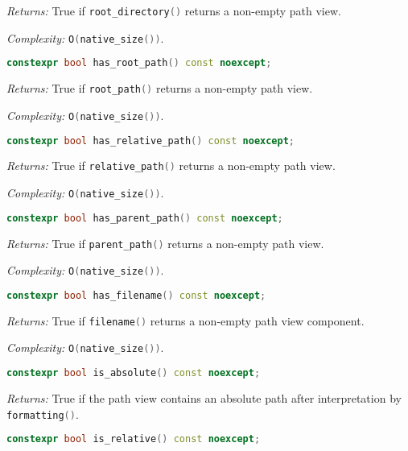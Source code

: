 \documentclass[11pt]{article}
\newcommand{\code}[2][cpp]{\lstinline[language=#1,basicstyle=\small\ttfamily]{#2}}
\newcommand{\desc}[1]{\textit{#1}}
\newcommand{\returns}{\desc{Returns: }}
\newcommand{\complexity}{\desc{Complexity: }}
\begin{document}
\returns True if \code{root_directory()} returns a non-empty path view.

\complexity \code{O(native_size())}.\\

\begin{lstlisting}[language=cpp]
    constexpr bool has_root_path() const noexcept;
\end{lstlisting}

\returns True if \code{root_path()} returns a non-empty path view.

\complexity \code{O(native_size())}.\\

\begin{lstlisting}[language=cpp]
    constexpr bool has_relative_path() const noexcept;
\end{lstlisting}

\returns True if \code{relative_path()} returns a non-empty path view.

\complexity \code{O(native_size())}.\\

\begin{lstlisting}[language=cpp]
    constexpr bool has_parent_path() const noexcept;
\end{lstlisting}

\returns True if \code{parent_path()} returns a non-empty path view.

\complexity \code{O(native_size())}.\\

\begin{lstlisting}[language=cpp]
    constexpr bool has_filename() const noexcept;
\end{lstlisting}

\returns True if \code{filename()} returns a non-empty path view component.

\complexity \code{O(native_size())}.\\

\begin{lstlisting}[language=cpp]
    constexpr bool is_absolute() const noexcept;
\end{lstlisting}

\returns True if the path view contains an absolute path after interpretation by \code{formatting()}.\\

\begin{lstlisting}[language=cpp]
    constexpr bool is_relative() const noexcept;
\end{lstlisting}
\end{document}
